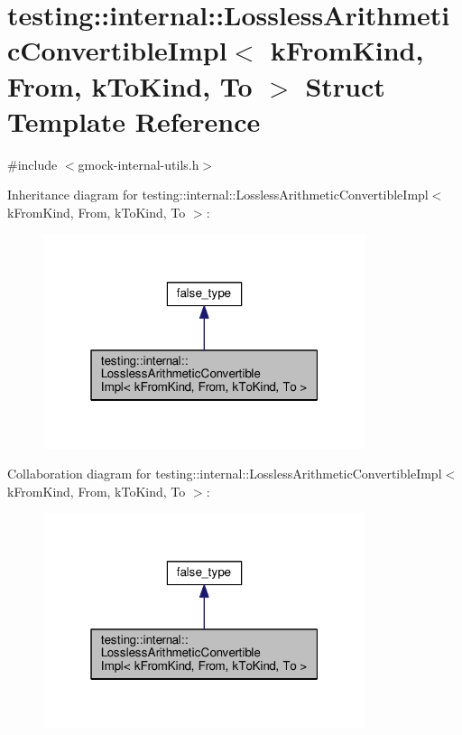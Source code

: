 \hypertarget{structtesting_1_1internal_1_1LosslessArithmeticConvertibleImpl}{}\section{testing\+:\+:internal\+:\+:Lossless\+Arithmetic\+Convertible\+Impl$<$ k\+From\+Kind, From, k\+To\+Kind, To $>$ Struct Template Reference}
\label{structtesting_1_1internal_1_1LosslessArithmeticConvertibleImpl}


{\ttfamily \#include $<$gmock-\/internal-\/utils.\+h$>$}



Inheritance diagram for testing\+:\+:internal\+:\+:Lossless\+Arithmetic\+Convertible\+Impl$<$ k\+From\+Kind, From, k\+To\+Kind, To $>$\+:\nopagebreak
\begin{figure}[H]
\begin{center}
\leavevmode
\includegraphics[width=268pt]{structtesting_1_1internal_1_1LosslessArithmeticConvertibleImpl__inherit__graph}
\end{center}
\end{figure}


Collaboration diagram for testing\+:\+:internal\+:\+:Lossless\+Arithmetic\+Convertible\+Impl$<$ k\+From\+Kind, From, k\+To\+Kind, To $>$\+:\nopagebreak
\begin{figure}[H]
\begin{center}
\leavevmode
\includegraphics[width=268pt]{structtesting_1_1internal_1_1LosslessArithmeticConvertibleImpl__coll__graph}
\end{center}
\end{figure}

